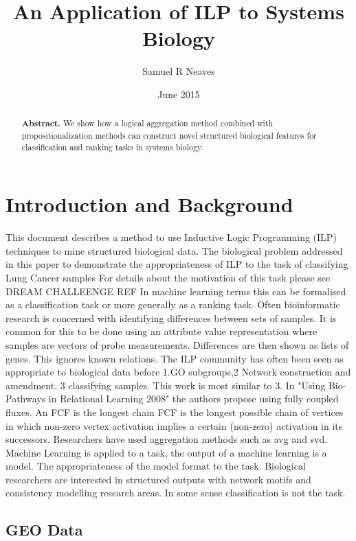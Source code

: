 \documentclass[•]{article}
\begin{document}
	\title{An Application of ILP to Systems Biology}
	\author{Samuel R Neaves}
	\date{June 2015}
	\maketitle
	
	\renewcommand{\abstractname}{}
	\begin{abstract}
	\textbf{Abstract.} We show how a logical aggregation method combined 
	with propositionalization methods can construct novel structured 
	biological features for 	classification and ranking tasks in 
	systems biology. 
	\end{abstract}
	\section{Introduction and Background}
	This document describes a method to use Inductive Logic Programming
	(ILP) techniques to mine structured biological data. 
	The biological problem addressed in this paper to demonstrate the
	appropriateness of ILP to the task of classifying Lung Cancer samples
	For details about the motivation of this task please see {DREAM CHALLEENGE 
	REF}
	In machine learning terms this can be formalised as a classification task
	or more generally as a ranking task. 
	Often bioinformatic research is concerned with identifying differences
	between sets of samples. It is common for this to be done using an 
	attribute value representation where samples are vectors of probe 
	measurements. Differences are then shown as lists of genes.
	This ignores known relations.
	The ILP community has often been seen as appropriate to biological 
	data before 1.GO subgroups,2 Network construction and amendment. 3 
	classifying samples.
	This work is most similar to 3. 
	In "Using Bio-Pathways in Relational Learning 2008" the authors propose
	using fully coupled fluxes. An FCF is the longest chain FCF is the 
	longest    possible chain of vertices in which non-zero vertex activation
	implies a certain (non-zero) activation in its successors.
	Researchers have used aggregation methods such as avg and svd.
	Machine Learning is applied to a task, the output of a machine learning 
	is a model. The appropriateness of the model format to the task.
	Biological researchers are interested in structured outputs with network
	motifs and consistency modelling research areas. 
	In some sense classification is not the task. 
	\subsection{GEO Data}
	
\end{document}
